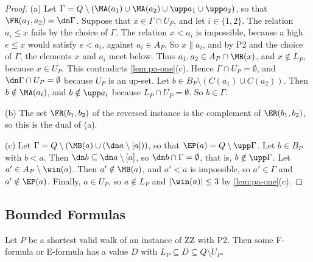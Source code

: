 \begin{proof}
(a) Let $\Gamma = Q \setminus (\MA(a_1) \cup \MA(a_2) \cup \upp a_1 \cup \upp a_2)$, so that $\FR(a_1, a_2) = \dn \Gamma$.
Suppose that $x \in \Gamma \cap U_P$, and let $i \in \{1, 2\}$.
The relation $a_i \leq x$ fails by the choice of $\Gamma$.
The relation $x < a_i$ is impossible, because a high $e \leq x$ would satisfy $e < a_i$, against $a_i \in A_P$.
So $x \parallel a_i$, and by P2 and the choice of $\Gamma$, the elements $x$ and $a_i$ meet below.
Thus $a_1, a_2 \in A_P \cap \MB(x)$, and $x \notin L_P$, because $x \in U_P$.
This contradicts \cref{lem:pa-one}(c).
Hence $\Gamma \cap U_P = \emptyset$, and $\dn \Gamma \cap U_P = \emptyset$ because $U_P$ is an up-set.
Let $b \in B_P \setminus (C(a_1) \cup C(a_2))$.
Then $b \notin \MA(a_i)$, and $b \notin \upp a_i$ because $L_P \cap U_P = \emptyset$.
So $b \in \Gamma$.

(b) The set $\FR(b_1, b_2)$ of the reversed instance is the complement of $\ER(b_1, b_2)$, so this is the dual of (a).

(c) Let $\Gamma = Q \setminus (\MB(a) \cup (\dn a \setminus [a]))$, so that $\EP(a) = Q \setminus \upp \Gamma$.
Let $b \in B_P$ with $b < a$.
Then $\dn b \subseteq \dn a \setminus [a]$, so $\dn b \cap \Gamma = \emptyset$, that is, $b \notin \upp \Gamma$.
Let $a' \in A_P \setminus \win(a)$.
Then $a' \notin \MB(a)$, and $a' < a$ is impossible, so $a' \in \Gamma$ and $a' \notin \EP(a)$.
Finally, $a \in U_P$, so $a \notin L_P$ and $|\win(a)| \leq 3$ by \cref{lem:pa-one}(c).
\end{proof}

\subsection{Bounded Formulas}
\label{sec:pa-formulas}

\begin{theorem}
\label{thm:pa-formulas}
Let $P$ be a shortest valid walk of an instance of ZZ with P2.
Then some F-formula or E-formula has a value $D$ with $L_P \subseteq D \subseteq Q \setminus U_P$.
\end{theorem}

